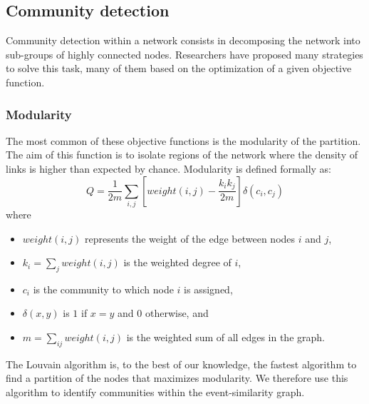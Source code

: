 \subsection{Community detection}
\label{Community detection}
Community detection within a network consists in decomposing the network into sub-groups of highly connected nodes. Researchers have proposed many strategies to solve this task, many of them based on the optimization of a given objective function. 

\subsubsection{Modularity}
The most common of these objective functions is the modularity \citep{newman2004finding} of the partition. The aim of this function is to isolate regions of the network where the density of links is higher than expected by chance. Modularity is defined formally  as:
\begin{equation}
    Q = \frac{1}{2m} \sum_{i,j}\left[weight(i,j) - \frac{k_i k_j}{2m}\right]\delta(c_i, c_j)
\end{equation}
where 
\begin{itemize}
    \item $weight(i,j)$ represents the weight of the edge between nodes $i$ and $j$, 
    \item $k_i = \sum\limits_j weight(i,j)$ is the weighted degree of $i$,
    \item $c_i$ is the community to which node $i$ is assigned,
    \item $\delta(x, y)$ is $1$ if $x = y$ and $0$ otherwise, and
    \item $m= \sum\limits_{ij} weight(i,j)$ is the weighted sum of all edges in the graph.
\end{itemize}
The Louvain algorithm \citep{blondel2008fast} is, to the best of our knowledge, the fastest algorithm to find a partition of the nodes that maximizes modularity. We therefore use this algorithm to identify communities within the event-similarity graph.

